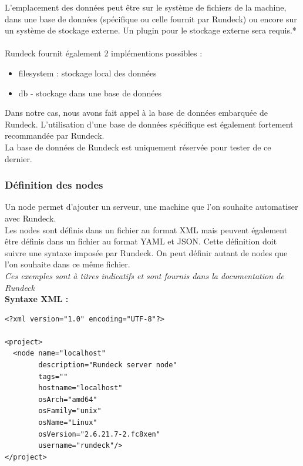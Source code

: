 \documentclass[12pt]{article}
\begin{document}
\vspace{0.2cm}
L'emplacement des données peut être sur le système de fichiers de la machine, dans une base de données (spécifique ou celle fournit par Rundeck) ou encore sur un système de stockage externe. Un plugin pour le stockage externe sera requis.*
\\
\vspace{0.2cm}
\\
Rundeck fournit également 2 implémentions possibles :
\begin{itemize}
    \item filesystem : stockage local des données
    \item db - stockage dans une base de données
\end{itemize}
\vspace{0.2cm}
Dans notre cas, nous avons fait appel à la base de données embarquée de Rundeck. L'utilisation d'une base de données spécifique est également fortement recommandée par Rundeck.
\\
La base de données de Rundeck est uniquement réservée pour tester de ce dernier.

\newpage
\subsubsection{Définition des nodes}
Un node permet d'ajouter un serveur, une machine que l'on souhaite automatiser avec Rundeck.
\\
Les nodes sont définis dans un fichier au format XML mais peuvent également être définis dans un fichier au format YAML et JSON. Cette définition doit suivre une syntaxe imposée par Rundeck. On peut définir autant de nodes que l'on souhaite dans ce même fichier.
\vspace{0.5cm}
\\
\textit{Ces exemples sont à titres indicatifs et sont fournis dans la documentation de Rundeck}
\vspace{0.5cm}
\\
\textbf{Syntaxe XML :}
\\
\begin{lstlisting}
<?xml version="1.0" encoding="UTF-8"?>

<project>
  <node name="localhost" 
        description="Rundeck server node" 
        tags="" 
        hostname="localhost" 
        osArch="amd64" 
        osFamily="unix" 
        osName="Linux" 
        osVersion="2.6.21.7-2.fc8xen" 
        username="rundeck"/>
</project>
\end{lstlisting}
\end{document}
